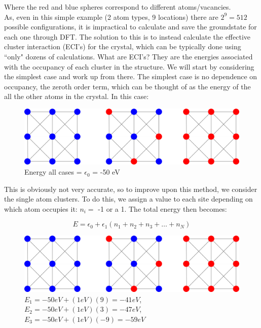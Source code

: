 \documentclass[12pt]{article}
\begin{document}
Where the red and blue spheres correspond to different atoms/vacancies.  \\

As, even in this simple example (2 atom types, 9 locations) there are $2^9 = 512$ possible configurations, it is impractical to calculate and save the groundstate for each one through DFT.   The solution to this is to instead calculate the effective cluster interaction (ECI's) for the crystal, which can be typically done using ``only" dozens of calculations.   What are ECI's?  They are the energies associated with the occupancy of each cluster in the structure. 
We will start by considering the simplest case and work up from there.  The simplest case is no dependence on occupancy, the zeroth order term, which can be thought of as the energy of the all the other atoms in the crystal.  In this case: 


\begin{figure}[H]
	\centering
	\includegraphics[scale=0.5]{./images/triplet.png}
	\caption*{Energy all cases = $\epsilon_0$ = -50 eV}
\end{figure}

This is obviously not very accurate, so to improve upon this method, we consider the single atom clusters.  To do this, we assign a value to each site depending on which atom occupies it: $n_i=$ -1 or a 1. The total energy then becomes: 

\[
E = \epsilon_0 + \epsilon_1 (n_1 + n_2 +n_3 + \dots + n_N )
\]


\begin{figure}[H]
	\centering
	\includegraphics[scale=0.5]{./images/triplet.png}
	\caption*{$E_1 =-50eV + (1eV)(9) = -41 eV$, $E_2 = -50eV+ (1eV)(3) = -47eV$, $E_3 = -50 eV + (1eV)(-9) = -59eV$}
\end{figure}
\end{document}
